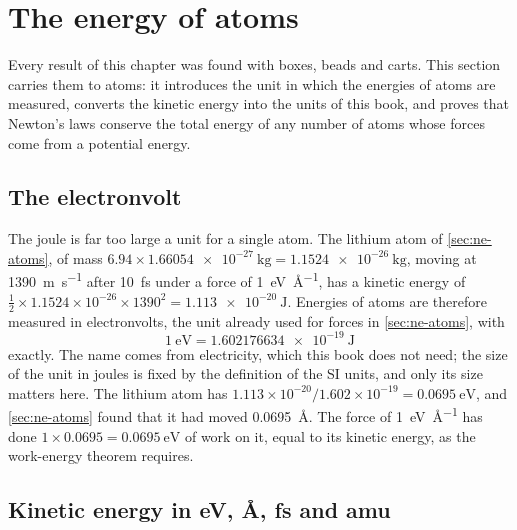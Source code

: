 \section{The energy of atoms}
\label{sec:en-atoms}

Every result of this chapter was found with boxes, beads and carts. This
section carries them to atoms: it introduces the unit in which the
energies of atoms are measured, converts the kinetic energy into the
units of this book, and proves that Newton's laws conserve the total
energy of any number of atoms whose forces come from a potential energy.

\subsection*{The electronvolt}

The joule is far too large a unit for a single atom. The lithium atom of
\cref{sec:ne-atoms}, of mass $6.94\times\SI{1.66054e-27}{\kilogram} =
\SI{1.1524e-26}{\kilogram}$, moving at \SI{1390}{\metre\per\second} after
\SI{10}{\femto\second} under a force of \SI{1}{\electronvolt\per
\angstrom}, has a kinetic energy of $\frac12\times1.1524\times10^{-26}
\times1390^2 = \SI{1.113e-20}{\joule}$. Energies of atoms are therefore
measured in electronvolts, the unit already used for forces in
\cref{sec:ne-atoms}, with
\begin{equation*}
   \SI{1}{\electronvolt} = \SI{1.602176634e-19}{\joule}
\end{equation*}
exactly. The name comes from electricity, which this book does not need;
the size of the unit in joules is fixed by the definition of the SI units,
and only its size matters here. The lithium atom has $1.113\times10^{-20}/1.602\times
10^{-19} = \SI{0.0695}{\electronvolt}$, and \cref{sec:ne-atoms} found
that it had moved \SI{0.0695}{\angstrom}. The force of
\SI{1}{\electronvolt\per\angstrom} has done
$1\times0.0695 = \SI{0.0695}{\electronvolt}$ of work on it, equal to its
kinetic energy, as the work-energy theorem requires.

\subsection*{Kinetic energy in eV, \AA, fs and amu}

